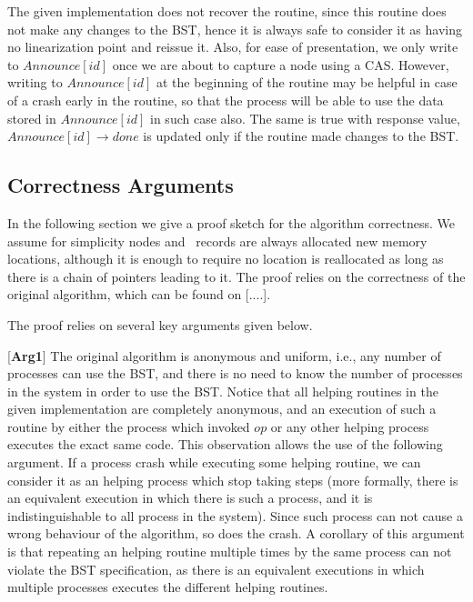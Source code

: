 The given implementation does not recover the  routine, since this routine does not make any changes to the BST, hence it is always safe to consider it as having no linearization point and reissue it. Also, for ease of presentation, we only write to $Announce[id]$ once we are about to capture a node using a CAS. However, writing to $Announce[id]$ at the beginning of the routine may be helpful in case of a crash early in the routine, so that the process will be able to use the data stored in $Announce[id]$ in such case also. The same is true with response value, $Announce[id]\rightarrow done$ is updated only if the routine made changes to the BST.

\subsection*{Correctness Arguments}

In the following section we give a proof sketch for the algorithm correctness. We assume for simplicity nodes and \Flag\ records are always allocated new memory locations, although it is enough to require no location is reallocated as long as there is a chain of pointers leading to it. The proof relies on the correctness of the original algorithm, which can be found on [....].

The proof relies on several key arguments given below.

\newcommand{\argAnonymous}{arg1}
[\textbf{Arg1}] The original algorithm is anonymous and uniform, i.e., any number of processes can use the BST, and there is no need to know the number of processes in the system in order to use the BST. Notice that all helping routines in the given implementation are completely anonymous, and an execution of such a routine by either the process which invoked $op$ or any other helping process executes the exact same code. This observation allows the use of the following argument. If a process crash while executing some helping routine, we can consider it as an helping process which stop taking steps (more formally, there is an equivalent execution in which there is such a process, and it is indistinguishable to all process in the system). Since such process can not cause a wrong behaviour of the algorithm, so does the crash.
A corollary of this argument is that repeating an helping routine multiple times by the same process can not violate the BST specification, as there is an equivalent executions in which multiple processes executes the different helping routines.

